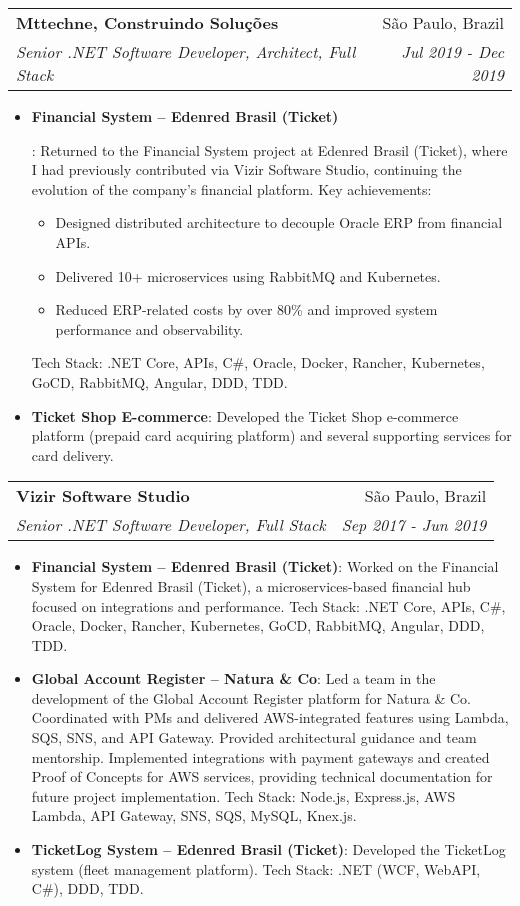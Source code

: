 \documentclass[letterpaper,11pt]{article}
\makeatletter
\newcommand{\resumeItem}[2]{
  \item\small{
    \textbf{#1}{: #2 \vspace{-2pt}}
  }
}
\newcommand{\resumeSubheading}[4]{
  \vspace{-1pt}\item
    \begin{tabular*}{0.97\textwidth}[t]{l@{\extracolsep{\fill}}r}
      \textbf{#1} & #2 \\
      \textit{\small#3} & \textit{\small #4} \\
    \end{tabular*}\vspace{-5pt}
}
\newcommand{\resumeItemListStart}{\begin{itemize}}
\newcommand{\resumeItemListEnd}{\end{itemize}\vspace{-5pt}}
\makeatother
\begin{document}
    \resumeSubheading
    {Mttechne, Construindo Soluções}{São Paulo, Brazil}
    {Senior .NET Software Developer, Architect, Full Stack}{Jul 2019 - Dec 2019}
    \resumeItemListStart
      \resumeItem{Financial System – Edenred Brasil (Ticket)}
        {Returned to the Financial System project at Edenred Brasil (Ticket), where I had previously contributed via Vizir Software Studio, continuing the evolution of the company's financial platform. Key achievements:
        \begin{itemize}
          \item Designed distributed architecture to decouple Oracle ERP from financial APIs.
          \item Delivered 10+ microservices using RabbitMQ and Kubernetes.
          \item Reduced ERP-related costs by over 80\% and improved system performance and observability.
        \end{itemize}
        Tech Stack: .NET Core, APIs, C\#, Oracle, Docker, Rancher, Kubernetes, GoCD, RabbitMQ, Angular, DDD, TDD.}
      \resumeItem{Ticket Shop E-commerce}
        {Developed the Ticket Shop e-commerce platform (prepaid card acquiring platform) and several supporting services for card delivery.}
    \resumeItemListEnd

    \resumeSubheading
    {Vizir Software Studio}{São Paulo, Brazil}
    {Senior .NET Software Developer, Full Stack}{Sep 2017 - Jun 2019}
    \resumeItemListStart
      \resumeItem{Financial System – Edenred Brasil (Ticket)}
        {Worked on the Financial System for Edenred Brasil (Ticket), a microservices-based financial hub focused on integrations and performance. 
        Tech Stack: .NET Core, APIs, C\#, Oracle, Docker, Rancher, Kubernetes, GoCD, RabbitMQ, Angular, DDD, TDD.}
      \resumeItem{Global Account Register – Natura \& Co}
        {Led a team in the development of the Global Account Register platform for Natura \& Co. Coordinated with PMs and delivered AWS-integrated features using Lambda, SQS, SNS, and API Gateway. Provided architectural guidance and team mentorship. Implemented integrations with payment gateways and created Proof of Concepts for AWS services, providing technical documentation for future project implementation.
        Tech Stack: Node.js, Express.js, AWS Lambda, API Gateway, SNS, SQS, MySQL, Knex.js.}
      \resumeItem{TicketLog System – Edenred Brasil (Ticket)}
        {Developed the TicketLog system (fleet management platform).
        Tech Stack: .NET (WCF, WebAPI, C\#), DDD, TDD.}
    \resumeItemListEnd
\end{document}
